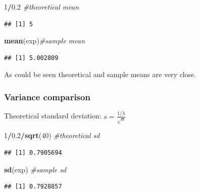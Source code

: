 \documentclass[
]{article}
\newenvironment{Shaded}{\begin{snugshade}}{\end{snugshade}}
\newcommand{\CommentTok}[1]{\textcolor[rgb]{0.56,0.35,0.01}{\textit{#1}}}
\newcommand{\DecValTok}[1]{\textcolor[rgb]{0.00,0.00,0.81}{#1}}
\newcommand{\FloatTok}[1]{\textcolor[rgb]{0.00,0.00,0.81}{#1}}
\newcommand{\KeywordTok}[1]{\textcolor[rgb]{0.13,0.29,0.53}{\textbf{#1}}}
\newcommand{\NormalTok}[1]{#1}
\newcommand{\OperatorTok}[1]{\textcolor[rgb]{0.81,0.36,0.00}{\textbf{#1}}}
\begin{document}
\begin{Shaded}
\begin{Highlighting}[]
\DecValTok{1}\OperatorTok{/}\FloatTok{0.2} \CommentTok{#theoretical mean}
\end{Highlighting}
\end{Shaded}

\begin{verbatim}
## [1] 5
\end{verbatim}

\begin{Shaded}
\begin{Highlighting}[]
\KeywordTok{mean}\NormalTok{(exp)}\CommentTok{#sample mean}
\end{Highlighting}
\end{Shaded}

\begin{verbatim}
## [1] 5.002809
\end{verbatim}

As could be seen theoretical and sample means are very close.

\hypertarget{variance-comparison}{%
\subsubsection{Variance comparison}\label{variance-comparison}}

Theoretical standard deviation: \(s=\frac{1/\lambda}{\sqrt{n}}\)

\begin{Shaded}
\begin{Highlighting}[]
\DecValTok{1}\OperatorTok{/}\FloatTok{0.2}\OperatorTok{/}\KeywordTok{sqrt}\NormalTok{(}\DecValTok{40}\NormalTok{) }\CommentTok{#theoretical sd}
\end{Highlighting}
\end{Shaded}

\begin{verbatim}
## [1] 0.7905694
\end{verbatim}

\begin{Shaded}
\begin{Highlighting}[]
\KeywordTok{sd}\NormalTok{(exp) }\CommentTok{#sample sd}
\end{Highlighting}
\end{Shaded}

\begin{verbatim}
## [1] 0.7928857
\end{verbatim}
\end{document}
